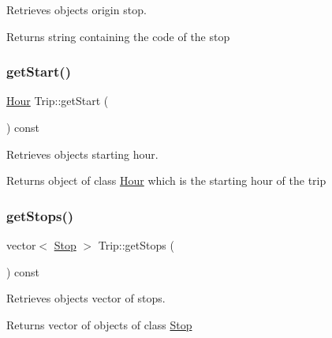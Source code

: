 Retrieves object\textquotesingle{}s origin stop. 

\begin{DoxyReturn}{Returns}
string containing the code of the stop 
\end{DoxyReturn}
\mbox{\label{group___trip_ga447efbf91bd4842daadac85d2bac4b9e}} 
\subsubsection{\texorpdfstring{get\+Start()}{getStart()}}
{\footnotesize\ttfamily \hyperlink{class_hour}{Hour} Trip\+::get\+Start (\begin{DoxyParamCaption}{ }\end{DoxyParamCaption}) const}



Retrieves object\textquotesingle{}s starting hour. 

\begin{DoxyReturn}{Returns}
object of class \hyperlink{class_hour}{Hour} which is the starting hour of the trip 
\end{DoxyReturn}
\mbox{\label{group___trip_gae081fb958af544c9cad9002d5696fb33}} 
\subsubsection{\texorpdfstring{get\+Stops()}{getStops()}}
{\footnotesize\ttfamily vector$<$ \hyperlink{class_stop}{Stop} $>$ Trip\+::get\+Stops (\begin{DoxyParamCaption}{ }\end{DoxyParamCaption}) const}



Retrieves object\textquotesingle{}s vector of stops. 

\begin{DoxyReturn}{Returns}
vector of objects of class \hyperlink{class_stop}{Stop} 
\end{DoxyReturn}
\mbox{\label{group___trip_gaa704cf099858e8de479f6fdd6229008f}} 
